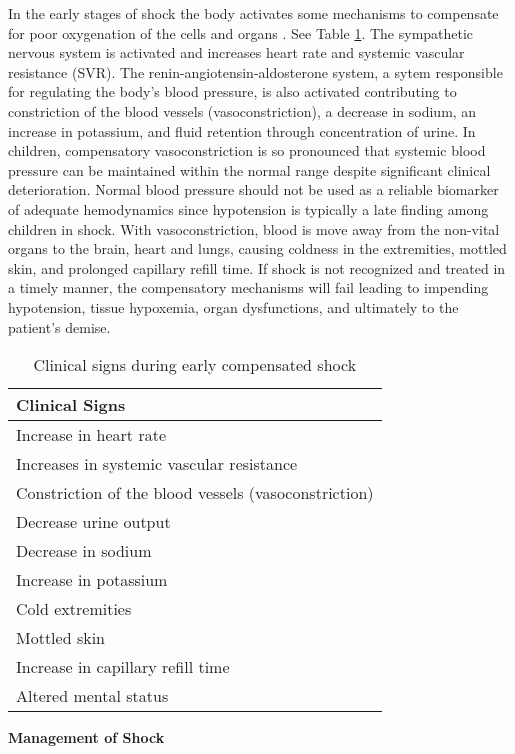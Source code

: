 \documentclass[
   technote
]{phildoc}
\newcommand{\tab}{Table}
\begin{document}
In the early stages of shock the body activates some mechanisms to compensate for poor oxygenation of the cells and organs \cite{Ayse:2008,Sinniah:2012,Brierley:2009}. See \tab{} \ref{tab:signs_shock}. The sympathetic nervous system is activated and increases heart rate and systemic vascular resistance (SVR). The renin-angiotensin-aldosterone system, a sytem responsible for regulating the body's blood pressure, is also activated contributing to constriction of the blood vessels (vasoconstriction), a decrease in sodium, an increase in potassium, and fluid retention through concentration of urine. In children, compensatory vasoconstriction is so pronounced that systemic blood pressure can be maintained within the normal range despite significant clinical deterioration. Normal blood pressure should not be used as a reliable biomarker of adequate hemodynamics since hypotension is typically a late finding among children in shock. With vasoconstriction, blood is move away from the non-vital organs to the brain, heart and lungs, causing coldness in the extremities, mottled skin, and prolonged capillary refill time. If shock is not recognized and treated in a timely manner, the compensatory mechanisms will fail leading to impending hypotension, tissue hypoxemia, organ dysfunctions, and ultimately to the patient's demise.


\begin{table}[h!]
\centering
\caption{Clinical signs during early compensated shock}
\label{tab:signs_shock}       
\begin{tabular}{l}
\hline
\textbf{Clinical Signs} \\
\hline
\hline
Increase in heart rate \\
\hline
Increases in systemic vascular resistance \\
\hline
Constriction of the blood vessels (vasoconstriction) \\
\hline
Decrease urine output \\
\hline
Decrease in sodium \\
\hline
Increase in potassium \\
\hline
Cold extremities \\
\hline
Mottled skin \\
\hline
Increase in capillary refill time \\
\hline
Altered mental status \\
\hline
\end{tabular}
\end{table}

\noindent\textbf{Management of Shock}
\end{document}
